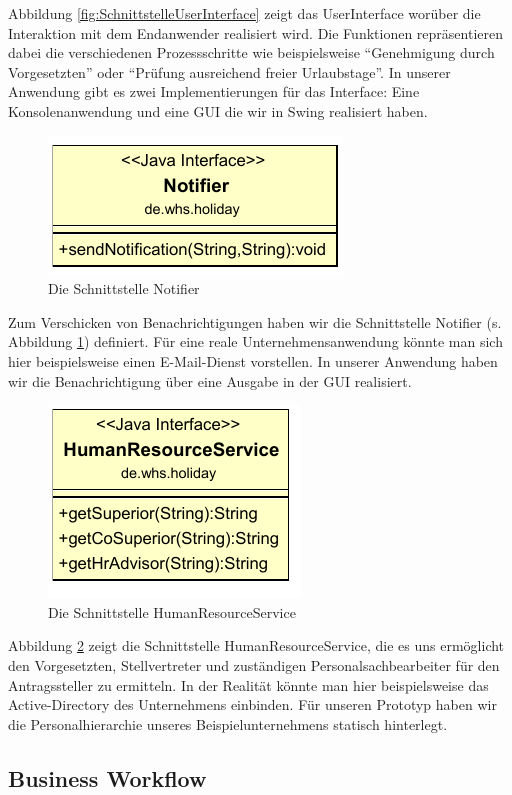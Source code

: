 Abbildung \ref{fig:SchnittstelleUserInterface} zeigt das UserInterface worüber die Interaktion mit dem Endanwender realisiert wird. Die Funktionen repräsentieren dabei die verschiedenen Prozessschritte wie beispielsweise "`Genehmigung durch Vorgesetzten"' oder "`Prüfung ausreichend freier Urlaubstage"'. In unserer Anwendung gibt es zwei Implementierungen für das Interface: Eine Konsolenanwendung und eine GUI die wir in Swing realisiert haben.

\begin{figure}[H]
\centering
\includegraphics[width=0.35\linewidth]{Bilder/SchnittstelleNotifier}
\caption{Die Schnittstelle Notifier}
\label{fig:SchnittstelleNotifier}
\end{figure}

Zum Verschicken von Benachrichtigungen haben wir die Schnittstelle Notifier (s. Abbildung \ref{fig:SchnittstelleNotifier}) definiert. Für eine reale Unternehmensanwendung könnte man sich hier beispielsweise einen E-Mail-Dienst vorstellen. In unserer Anwendung haben wir die Benachrichtigung über eine Ausgabe in der GUI realisiert.

\begin{figure}[H]
\centering
\includegraphics[width=0.3\linewidth]{Bilder/SchnittstelleHumanResourceService}
\caption{Die Schnittstelle HumanResourceService}
\label{fig:SchnittstelleHumanResourceService}
\end{figure}

Abbildung \ref{fig:SchnittstelleHumanResourceService} zeigt die Schnittstelle HumanResourceService, die es uns ermöglicht den Vorgesetzten, Stellvertreter und zuständigen Personalsachbearbeiter für den Antragssteller zu ermitteln. In der Realität könnte man hier beispielsweise das Active-Directory des Unternehmens einbinden. Für unseren Prototyp haben wir die Personalhierarchie unseres Beispielunternehmens statisch hinterlegt.

\subsection{Business Workflow}

